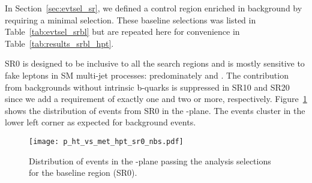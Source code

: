 In Section~\ref{sec:evtsel_sr}, we defined a control region enriched in
background by requiring a minimal selection. These baseline selections was
listed in Table~\ref{tab:evtsel_srbl} but are repeated here for convenience in
Table~\ref{tab:results_srbl_hpt}.
\begin{table}[!htb]
\begin{center}
\caption[Summary of the baseline search regions considered in the \hpt analysis]
{\label{tab:results_srbl_hpt}
Summary of the baseline search regions considered in the \hpt and \lpt analysis.
}
\end{center}
\end{table}  
SR0 is designed to be inclusive to all the search regions and is mostly
sensitive to fake leptons in SM multi-jet processes: predominately \ttbar
and \Wj. The contribution from backgrounds without intrinsic b-quarks is
suppressed in SR10 and SR20 since we add a \nbtags requirement of exactly one
and two or more, respectively. Figure~\ref{fig:results_hpt_ht_vs_met} shows
the distribution of events from SR0 in the \Ht-\met plane. The events cluster
in the lower left corner as expected for background events.
\begin{figure}[!htb]
\begin{center}
\texttt{[image: p\_ht\_vs\_met\_hpt\_sr0\_nbs.pdf]}
\end{center}
\caption[Distribution of events in the \Ht-\met plane passing the analysis selections for the \hpt baseline region]
{\label{fig:results_hpt_ht_vs_met}
Distribution of events in the \Ht-\met plane passing the analysis selections
for the \hpt baseline region (SR0).
}
\end{figure}

